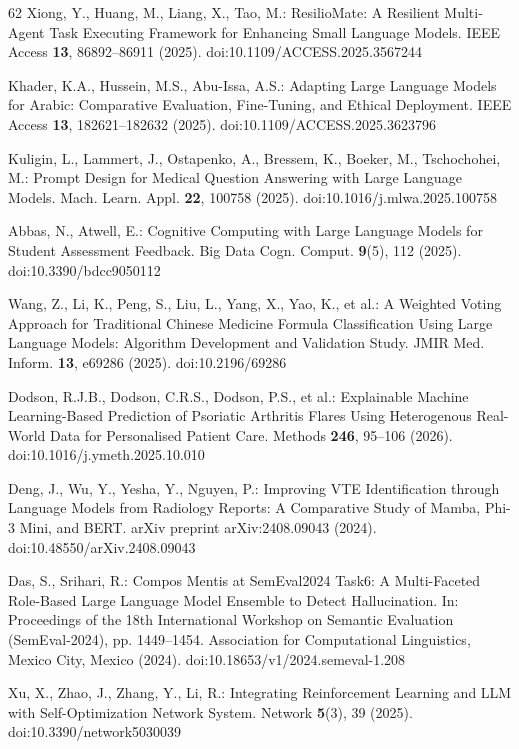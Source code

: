 \begin{thebibliography}{62}
Xiong, Y., Huang, M., Liang, X., Tao, M.: ResilioMate: A Resilient Multi-Agent Task Executing Framework for Enhancing Small Language Models. IEEE Access \textbf{13}, 86892--86911 (2025). doi:10.1109/ACCESS.2025.3567244

Khader, K.A., Hussein, M.S., Abu-Issa, A.S.: Adapting Large Language Models for Arabic: Comparative Evaluation, Fine-Tuning, and Ethical Deployment. IEEE Access \textbf{13}, 182621--182632 (2025). doi:10.1109/ACCESS.2025.3623796

Kuligin, L., Lammert, J., Ostapenko, A., Bressem, K., Boeker, M., Tschochohei, M.: Prompt Design for Medical Question Answering with Large Language Models. Mach. Learn. Appl. \textbf{22}, 100758 (2025). doi:10.1016/j.mlwa.2025.100758

Abbas, N., Atwell, E.: Cognitive Computing with Large Language Models for Student Assessment Feedback. Big Data Cogn. Comput. \textbf{9}(5), 112 (2025). doi:10.3390/bdcc9050112

Wang, Z., Li, K., Peng, S., Liu, L., Yang, X., Yao, K., et al.: A Weighted Voting Approach for Traditional Chinese Medicine Formula Classification Using Large Language Models: Algorithm Development and Validation Study. JMIR Med. Inform. \textbf{13}, e69286 (2025). doi:10.2196/69286

Dodson, R.J.B., Dodson, C.R.S., Dodson, P.S., et al.: Explainable Machine Learning-Based Prediction of Psoriatic Arthritis Flares Using Heterogenous Real-World Data for Personalised Patient Care. Methods \textbf{246}, 95--106 (2026). doi:10.1016/j.ymeth.2025.10.010

Deng, J., Wu, Y., Yesha, Y., Nguyen, P.: Improving VTE Identification through Language Models from Radiology Reports: A Comparative Study of Mamba, Phi-3 Mini, and BERT. arXiv preprint arXiv:2408.09043 (2024). doi:10.48550/arXiv.2408.09043

Das, S., Srihari, R.: Compos Mentis at SemEval2024 Task6: A Multi-Faceted Role-Based Large Language Model Ensemble to Detect Hallucination. In: Proceedings of the 18th International Workshop on Semantic Evaluation (SemEval-2024), pp. 1449--1454. Association for Computational Linguistics, Mexico City, Mexico (2024). doi:10.18653/v1/2024.semeval-1.208

Xu, X., Zhao, J., Zhang, Y., Li, R.: Integrating Reinforcement Learning and LLM with Self-Optimization Network System. Network \textbf{5}(3), 39 (2025). doi:10.3390/network5030039


\end{thebibliography}
